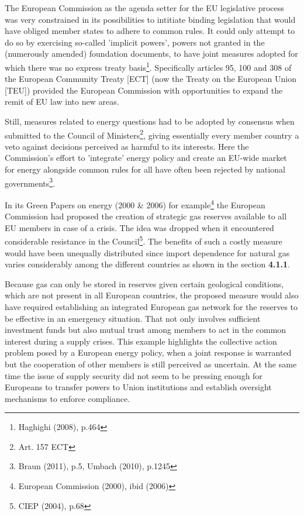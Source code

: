 \documentclass[11pt,a4paper,english]{scrreprt}
\begin{document}
The European Commission as the agenda setter for the EU legislative process was
very constrained in its possibilities to intitiate binding legislation that
would have obliged member states to adhere to common rules. It could only
attempt to do so by exercising so-called 'implicit powers', powers not granted
in the (numerously amended) foundation documents, to have joint measures adopted
for which there was no express treaty basis\footnote{Haghighi (2008), p.464}.
Specifically articles 95, 100 and 308 of the European Community Treaty [ECT]
(now the Treaty on the European Union [TEU]) provided the European Commission
with opportunities to expand the remit of EU law into new areas.\par
 
Still, measures related to energy questions had to be adopted by consensus when
submitted to the Council of Ministers\footnote{Art. 157 ECT}, giving
essentially every member country a veto against decisions perceived as harmful
to its interests. Here the Commission's effort to 'integrate' energy policy and
create an EU-wide market for energy alongside common rules for all have often
been rejected by national governments\footnote{Braun (2011), p.5, Umbach
(2010), p.1245}.\par

In its Green Papers on energy (2000 \& 2006) for example\footnote{European
Commission (2000), ibid (2006)} the European Commission had proposed the
creation of strategic gas reserves available to all EU members in case of a
crisis. The idea was dropped when it encountered considerable resistance in the
Council\footnote{CIEP (2004), p.68}. The benefits of such a costly measure would
have been unequally distributed since import dependence for natural gas
varies considerably among the different countries as shown in the section
\textbf{4.1.1}.\par

Because gas can only be stored in reserves given certain geological
conditions, which are not present in all European countries, the proposed
measure would also have required establishing an integrated European gas network
for the reserves to be effective in an emergency situation. That not only
involves sufficient investment funds but also mutual trust among members to act
in the common interest during a supply crises. This example highlights the
collective action problem posed by a European energy policy, when a joint
response is warranted but the cooperation of other members is still perceived as
uncertain. At the same time the issue of supply security did not seem to be
pressing enough for Europeans to transfer powers to Union institutions and 
establish oversight mechanisms to enforce compliance.\par
\end{document}
